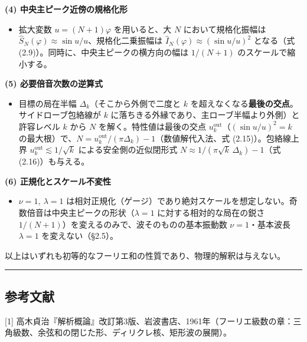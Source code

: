 \documentclass[
]{ltjsarticle}
\providecommand{\tightlist}{%
  \setlength{\itemsep}{0pt}\setlength{\parskip}{0pt}}
\begin{document}
\textbf{(4) 中央主ピーク近傍の規格化形}

\begin{itemize}
\tightlist
\item
  拡大変数 \(u=(N+1)\varphi\) を用いると、大 \(N\) において規格化振幅は
  \(\widehat{S}_N(\varphi)\approx \sin u/u\)、規格化二乗振幅は
  \(\widehat{I}_N(\varphi)\approx(\sin u/u)^2\) となる（式
  (2.9)）。同時に、中央主ピークの横方向の幅は \(1/(N+1)\)
  のスケールで縮小する。
\end{itemize}

\textbf{(5) 必要倍音次数の逆算式}

\begin{itemize}
\tightlist
\item
  目標の局在半幅 \(\Delta_k\)（そこから外側で二度と \(k\)
  を超えなくなる\textbf{最後の交点}。サイドローブ包絡線が \(k\)
  に落ちきる外縁であり、主ローブ半幅より外側）と許容レベル \(k\) から
  \(N\) を解く。特性値は最後の交点
  \(u_k^{\mathrm{out}}\)（\((\sin u/u)^2=k\)
  の最大根）で、\(N=u_k^{\mathrm{out}}/(\pi\Delta_k)-1\)（数値解代入法、式
  (2.15)）。包絡線上界 \(u_k^{\mathrm{out}}\lesssim1/\sqrt{k}\)
  による安全側の近似閉形式 \(N\approx1/(\pi\sqrt{k}\,\Delta_k)-1\)（式
  (2.16)）も与える。
\end{itemize}

\textbf{(6) 正規化とスケール不変性}

\begin{itemize}
\tightlist
\item
  \(\nu=1,\ \lambda=1\)
  は相対正規化（ゲージ）であり絶対スケールを想定しない。奇数倍音は中央主ピークの形状（\(\lambda=1\)
  に対する相対的な局在の鋭さ
  \(1/(N+1)\)）を変えるのみで、波そのものの基本振動数
  \(\nu=1\)・基本波長 \(\lambda=1\) を変えない（§2.5）。
\end{itemize}

以上はいずれも初等的なフーリエ和の性質であり、物理的解釈は与えない。

\begin{center}\rule{0.5\linewidth}{0.5pt}\end{center}

\subsection{参考文献}\label{ux53c2ux8003ux6587ux732e}

{[}1{]}
高木貞治『解析概論』改訂第3版、岩波書店、1961年（フーリエ級数の章：三角級数、余弦和の閉じた形、ディリクレ核、矩形波の展開）。
\end{document}
